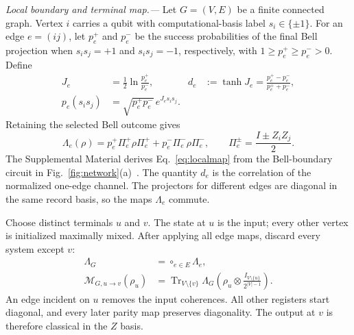 \documentclass[aps,prl,reprint,amsmath,amssymb,superscriptaddress,nofootinbib,floatfix]{revtex4-2}
\newcommand{\Tr}{\operatorname{Tr}}
\newcommand{\Mmap}{\mathcal{M}}
\begin{document}
\textit{Local boundary and terminal map.---}
Let $G=(V,E)$ be a finite connected graph. Vertex $i$ carries a qubit with computational-basis label $s_i\in\{\pm1\}$. For an edge $e=(ij)$, let $p_e^+$ and $p_e^-$ be the success probabilities of the final Bell projection when $s_is_j=+1$ and $s_is_j=-1$, respectively, with $1\ge p_e^+\ge p_e^->0$. Define
\begin{align}
 J_e&=\frac12\ln\frac{p_e^+}{p_e^-},&
 d_e&:=\tanh J_e=\frac{p_e^+-p_e^-}{p_e^++p_e^-},\nonumber\\
 p_e(s_is_j)&=\sqrt{p_e^+p_e^-}\,e^{J_es_is_j}.
\label{eq:edge}
\end{align}
Retaining the selected Bell outcome gives
\begin{equation}
 \Lambda_e(\rho)=p_e^+\Pi_e^+\rho\Pi_e^+ +p_e^-\Pi_e^-\rho\Pi_e^-,\qquad \Pi_e^\pm=\frac{I\pm Z_iZ_j}{2}.
\label{eq:localmap}
\end{equation}
The Supplemental Material derives Eq.~\eqref{eq:localmap} from the Bell-boundary circuit in Fig.~\ref{fig:network}(a)~\cite{Lloyd2011,SM}. The quantity $d_e$ is the correlation of the normalized one-edge channel. The projectors for different edges are diagonal in the same record basis, so the maps $\Lambda_e$ commute.

Choose distinct terminals $u$ and $v$. The state at $u$ is the input; every other vertex is initialized maximally mixed. After applying all edge maps, discard every system except $v$:
\begin{align}
 \Lambda_G&=\mathop{\circ}_{e\in E}\Lambda_e,\nonumber\\
 \Mmap_{G,u\to v}(\rho_u)&=\Tr_{V\setminus\{v\}}\Lambda_G\!\left(\rho_u\otimes\frac{I_{V\setminus\{u\}}}{2^{|V|-1}}\right).
\label{eq:globalmap}
\end{align}
An edge incident on $u$ removes the input coherences. All other registers start diagonal, and every later parity map preserves diagonality. The output at $v$ is therefore classical in the $Z$ basis.
\end{document}
